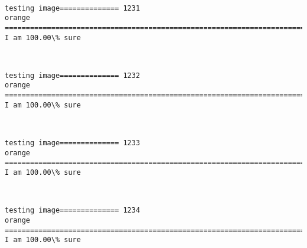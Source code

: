 \documentclass[11pt]{article}
\begin{document}
    \begin{center}
    \end{center}
    { \hspace*{\fill} \\}
    
    \begin{Verbatim}[commandchars=\\\{\}]
testing image============== 1231
orange
============================================================================
I am 100.00\% sure

    \end{Verbatim}

    \begin{center}
    \end{center}
    { \hspace*{\fill} \\}
    
    \begin{Verbatim}[commandchars=\\\{\}]
testing image============== 1232
orange
============================================================================
I am 100.00\% sure

    \end{Verbatim}

    \begin{center}
    \end{center}
    { \hspace*{\fill} \\}
    
    \begin{Verbatim}[commandchars=\\\{\}]
testing image============== 1233
orange
============================================================================
I am 100.00\% sure

    \end{Verbatim}

    \begin{center}
    \end{center}
    { \hspace*{\fill} \\}
    
    \begin{Verbatim}[commandchars=\\\{\}]
testing image============== 1234
orange
============================================================================
I am 100.00\% sure

    \end{Verbatim}
\end{document}
